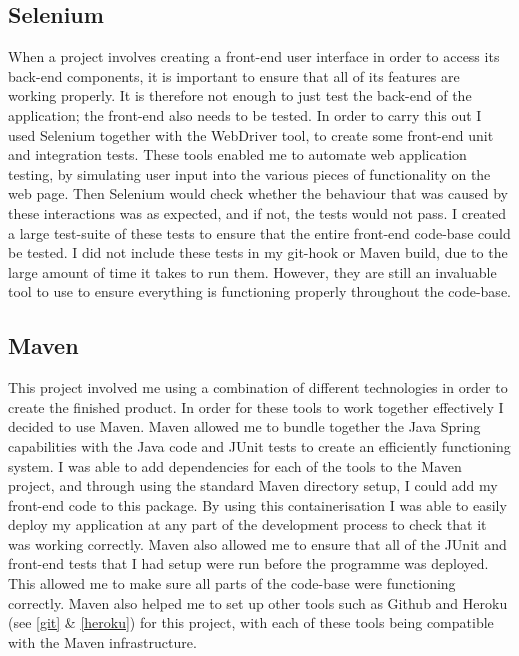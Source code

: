 \subsection{Selenium \label{selenium}}

When a project involves creating a front-end user interface in order to access its back-end components, it is important to ensure that all of its features are working properly. It is therefore not enough to just test the back-end of the application; the front-end also needs to be tested. In order to carry this out I used Selenium together with the WebDriver tool, to create some front-end unit and integration tests. These tools enabled me to automate web application testing, by simulating user input into the various pieces of functionality on the web page. Then Selenium would check whether the behaviour that was caused by these interactions was as expected, and if not, the tests would not pass. I created a large test-suite of these tests to ensure that the entire front-end code-base could be tested. I did not include these tests in my git-hook or Maven build, due to the large amount of time it takes to run them. However, they are still an invaluable tool to use to ensure everything is functioning properly throughout the code-base.

\subsection{Maven \label{maven}}

This project involved me using a combination of different technologies in order to create the finished product. In order for these tools to work together effectively I decided to use Maven. Maven allowed me to bundle together the Java Spring capabilities with the Java code and JUnit tests to create an efficiently functioning system. I was able to add dependencies for each of the tools to the Maven project, and through using the standard Maven directory setup, I could add my front-end code to this package. By using this containerisation I was able to easily deploy my application at any part of the development process to check that it was working correctly. Maven also allowed me to ensure that all of the JUnit and front-end tests that I had setup were run before the programme was deployed. This allowed me to make sure all parts of the code-base were functioning correctly. Maven also helped me to set up other tools such as Github and Heroku (see \ref{git} \& \ref{heroku}) for this project, with each of these tools being compatible with the Maven infrastructure.

